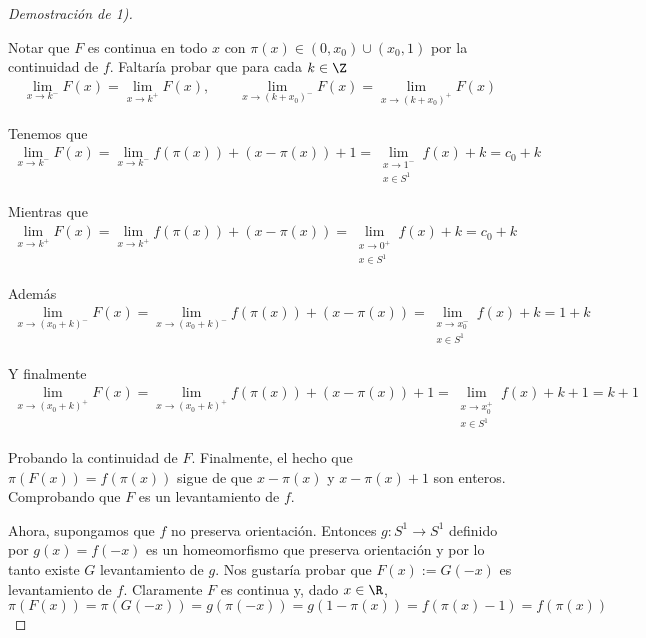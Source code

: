 \documentclass[	docname= Sistemas\ Din\'amicos,
				finished=1,
				semester=1,
				year=2017,
				professor=Godofredo\ Iommi,
				sigla=MAT2565]{apunte}
\begin{document}
\begin{proof}[Demostración de 1)]
\begin{casos}
			 Notar que $F$ es continua en todo $x$ con $\pi(x) \in (0,x_{0}) \cup (x_{0}, 1)$ por la continuidad de $f$. Faltaría probar que para cada $k \in \Z$
			 	\begin{align*}
					\lim_{x \to k^{-}} F(x)	
						=	\lim_{x \to k^{+}} F(x),	\qquad
					\lim_{x \to (k + x_{0})^{-}} F(x)
						=	\lim_{x \to (k+x_{0})^{+}} F(x)
				\end{align*}
			
			Tenemos que
				\begin{align*}
					\lim_{x \to k^{-}} F(x)
						=	\lim_{x \to k^{-}} f(\pi(x)) + (x- \pi(x)) + 1
						=	\lim_{\substack{x \to 1^{-} \\ x \in S^{1}}} f(x) + k 
						=	c_{0} + k
				\end{align*}
			
			Mientras que
				\begin{align*}
					\lim_{x \to k^{+}} F(x)
						=	\lim_{x \to k^{+}} f(\pi(x)) + (x - \pi(x))
						=	\lim_{\substack{x \to 0^{+} \\ x \in S^{1}}} f(x) + k
						=	c_{0} + k
				\end{align*}
			
			Además
				\begin{align*}
					\lim_{x \to (x_{0} + k)^{-}} F(x)
						=	\lim_{x \to (x_{0} + k)^{-}} f(\pi(x)) + (x- \pi(x))
						=	\lim_{\substack{x \to x_{0}^{-} \\ x \in S^{1}}} f(x) + k
						=	1 + k
				\end{align*}
			
			Y finalmente
				\begin{align*}
					\lim_{x \to (x_{0} + k)^{+}} F(x)
						=	\lim_{x \to (x_{0} + k)^{+}} f(\pi(x)) + (x- \pi(x)) + 1
						=	\lim_{\substack{x \to x_{0}^{+} \\ x \in S^{1}}} f(x) + k + 1
						=	k + 1
				\end{align*}
			
			Probando la continuidad de $F$. Finalmente, el hecho que $\pi(F(x)) = f(\pi(x))$ sigue de que $x - \pi(x)$ y $x - \pi(x) + 1$ son enteros. Comprobando que $F$ es un levantamiento de $f$.
	\end{casos}

Ahora, supongamos que $f$ no preserva orientación. Entonces $g: S^{1} \to S^{1}$ definido por $g(x) = f(-x)$ es un homeomorfismo que preserva orientación y por lo tanto existe $G$ levantamiento de $g$. Nos gustaría probar que $F(x) := G(-x)$ es levantamiento de $f$. Claramente $F$ es continua y, dado $x \in \R$,
	$$\pi(F(x)) = \pi(G(-x)) = g(\pi(-x)) = g(1- \pi(x)) = f(\pi(x) - 1) = f(\pi(x))$$ 
\end{proof}
\end{document}
